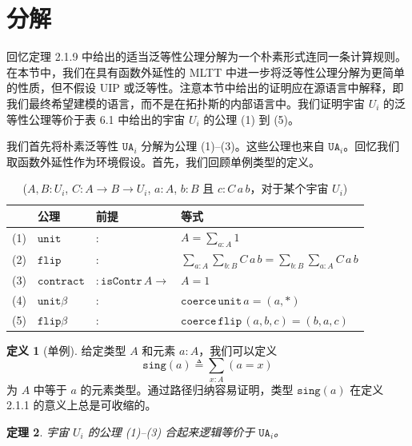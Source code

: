 \documentclass{ctexrep}
\theoremstyle{plain}
\newtheorem{theorem}{定理}[section]
\theoremstyle{definition}
\newtheorem{definition}[theorem]{定义}
\theoremstyle{remark}
\begin{document}
\section{分解}

回忆定理 2.1.9 中给出的适当泛等性公理分解为一个朴素形式连同一条计算规则。在本节中，我们在具有函数外延性的 MLTT 中进一步将泛等性公理分解为更简单的性质，但不假设 UIP 或泛等性。注意本节中给出的证明应在源语言中解释，即我们最终希望建模的语言，而不是在拓扑斯的内部语言中。我们证明宇宙 $U_i$ 的泛等性公理等价于表 6.1 中给出的宇宙 $U_i$ 的公理 (1) 到 (5)。

我们首先将朴素泛等性 $\mathtt{UA}_i$ 分解为公理 (1)--(3)。这些公理也来自 $\mathtt{UA}_i$。回忆我们取函数外延性作为环境假设。首先，我们回顾单例类型的定义。

\begin{table}[h]
\centering
\begin{tabular}{|c|l|l|l|}
\hline
& \textbf{公理} & \textbf{前提} & \textbf{等式} \\
\hline
(1) & $\mathtt{unit}$ & $:$ & $A = \sum_{a:A} 1$ \\
(2) & $\mathtt{flip}$ & $:$ & $\sum_{a:A}\sum_{b:B} C\,a\,b = \sum_{b:B}\sum_{a:A} C\,a\,b$ \\
(3) & $\mathtt{contract}$ & $: \mathtt{isContr}\,A \to$ & $A = 1$ \\
(4) & $\mathtt{unit}\beta$ & $:$ & $\mathtt{coerce}\,\mathtt{unit}\,a = (a, *)$ \\
(5) & $\mathtt{flip}\beta$ & $:$ & $\mathtt{coerce}\,\mathtt{flip}\,(a, b, c) = (b, a, c)$ \\
\hline
\end{tabular}
\caption{($A, B : U_i$, $C : A \to B \to U_i$, $a : A$, $b : B$ 且 $c : C\,a\,b$，对于某个宇宙 $U_i$)}
\end{table}

\begin{definition}[单例]
给定类型 $A$ 和元素 $a : A$，我们可以定义
\[
\mathtt{sing}(a) \triangleq \sum_{x:A}(a = x)
\]
为 $A$ 中等于 $a$ 的元素类型。通过路径归纳容易证明，类型 $\mathtt{sing}(a)$ 在定义 2.1.1 的意义上总是可收缩的。
\end{definition}

\begin{theorem}
宇宙 $U_i$ 的公理 (1)--(3) 合起来逻辑等价于 $\mathtt{UA}_i$。
\end{theorem}
\end{document}
